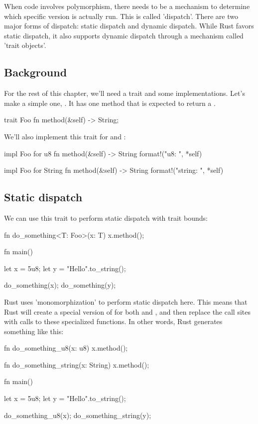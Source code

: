 When code involves polymorphism, there needs to be a mechanism to determine which specific version is actually run. This is called 
'dispatch'. There are two major forms of dispatch: static dispatch and dynamic dispatch. While Rust favors static dispatch, it also 
supports dynamic dispatch through a mechanism called 'trait objects'.

\subsection*{Background}

For the rest of this chapter, we'll need a trait and some implementations. Let's make a simple one, . It has one method that 
is expected to return a \String.

\begin{rustc}
trait Foo {
    fn method(&self) -> String;
}
\end{rustc}

We'll also implement this trait for  and \String:

\begin{rustc}
impl Foo for u8 {
    fn method(&self) -> String { format!("u8: {}", *self) }
}

impl Foo for String {
    fn method(&self) -> String { format!("string: {}", *self) }
}
\end{rustc}

\subsection*{Static dispatch}

We can use this trait to perform static dispatch with trait bounds:

\begin{rustc}
fn do_something<T: Foo>(x: T) {
    x.method();
}

fn main() {
    let x = 5u8;
    let y = "Hello".to_string();

    do_something(x);
    do_something(y);
}
\end{rustc}

Rust uses 'monomorphization' to perform static dispatch here. This means that Rust will create a special version of  for 
both  and \String, and then replace the call sites with calls to these specialized functions. In other words, Rust generates something 
like this:

\begin{rustc}
fn do_something_u8(x: u8) {
    x.method();
}

fn do_something_string(x: String) {
    x.method();
}

fn main() {
    let x = 5u8;
    let y = "Hello".to_string();

    do_something_u8(x);
    do_something_string(y);
}
\end{rustc}

